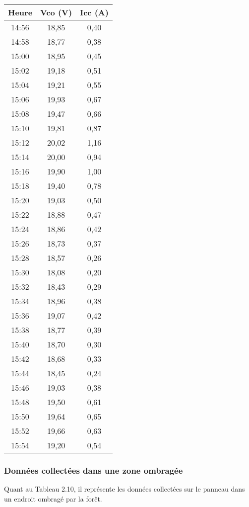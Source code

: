\begin{table}[H]
\begin{minipage}[t]{0.45\linewidth}
		\centering
		\begin{tabular}{|c|c|c|}
			\hline
			\textbf{Heure} & \textbf{Vco (V)} & \textbf{Icc (A)} \\
			\hline
			14:56 & 18,85 & 0,40 \\
			14:58 & 18,77 & 0,38 \\
			15:00 & 18,95 & 0,45 \\
			15:02 & 19,18 & 0,51 \\
			15:04 & 19,21 & 0,55 \\
			15:06 & 19,93 & 0,67 \\
			15:08 & 19,47 & 0,66 \\
			15:10 & 19,81 & 0,87 \\
			15:12 & 20,02 & 1,16 \\
			15:14 & 20,00 & 0,94 \\
			15:16 & 19,90 & 1,00 \\
			15:18 & 19,40 & 0,78 \\
			15:20 & 19,03 & 0,50 \\
			15:22 & 18,88 & 0,47 \\
			15:24 & 18,86 & 0,42 \\
			15:26 & 18,73 & 0,37 \\
			15:28 & 18,57 & 0,26 \\
			15:30 & 18,08 & 0,20 \\
			15:32 & 18,43 & 0,29 \\
			15:34 & 18,96 & 0,38 \\
			15:36 & 19,07 & 0,42 \\
			15:38 & 18,77 & 0,39 \\
			15:40 & 18,70 & 0,30 \\
			15:42 & 18,68 & 0,33 \\
			15:44 & 18,45 & 0,24 \\
			15:46 & 19,03 & 0,38 \\
			15:48 & 19,50 & 0,61 \\
			15:50 & 19,64 & 0,65 \\
			15:52 & 19,66 & 0,63 \\
			15:54 & 19,20 & 0,54 \\
			\hline
		\end{tabular}
	\end{minipage}
\end{table}


\subsubsection{Données collectées dans une zone ombragée}
Quant au Tableau 2.10, il représente les données collectées sur le panneau dans un endroit ombragé par la forêt.

